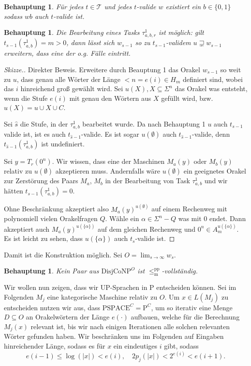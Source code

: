 \documentclass[nofonts]{uebung}
\newtheorem{claim}[theorem]{Behauptung}
\def\P{\ensuremath{\mathrm{P}}}
\def\DisjCoNP{\ensuremath{\mathrm{DisjCoNP}}}
\def\leqmpp{\ensuremath{\leq_\mathrm{m}^\mathrm{pp}}}
\begin{document}
\begin{claim}
    Für jedes $t\in\mathcal T$ und jedes $t$-valide $w$ existiert ein $b\in\{0,1\}$ sodass $wb$ auch $t$-valide ist.
\end{claim}

\begin{claim}
    Die Bearbeitung eines Tasks $\tau^1_{a,b,r}$ ist möglich: gilt $t_{s-1}(\tau^1_{a,b})=m>0$, dann lässt sich $w_{s-1}$ so zu $t_{s-1}$-validem $u\sqsupsetneq w_{s-1}$ erweitern, dass eine der o.g. Fälle eintritt.
\end{claim}
\begin{proof}[Skizze.]
    Direkter Beweis. %
    Erweitere durch Beauptung 1 das Orakel $w_{s-1}$ so weit zu $u$, dass genau alle Wörter der Länge $<n=e(i)\in H_m$ definiert sind, wobei das $i$ hinreichend groß gewählt wird. Sei $u(X), X\subseteq \Sigma^n$ das Orakel was entsteht, wenn die Stufe $e(i)$ mit genau den Wörtern aus $X$ gefüllt wird, bzw. $u(X)=u\cup X\cup C$.

    Sei $\hat{s}$ die Stufe, in der $\tau^1_{a,b}$ bearbeitet wurde.
    Da nach Behauptung 1 $u$ auch $t_{s-1}$ valide ist, ist es auch $t_{\hat{s}-1}$-valide.
    Es ist sogar $u(\emptyset)$ auch $t_{\hat{s}-1}$-valide, denn $t_{\hat{s}-1}(\tau^1_{a,b})$ ist undefiniert.

    Sei $y=T_r(0^n)$.
    Wir wissen, dass eine der Maschinen $M_a(y)$ oder $M_b(y)$ relativ zu $u(\emptyset)$ akzeptieren muss.
    Andernfalls wäre $u(\emptyset)$ ein geeignetes Orakel zur Zerstörung des Paars $M_a$, $M_b$ in der Bearbeitung von Task $\tau^1_{a,b}$ und wir hätten $t_{s-1}(\tau^1_{a,b})=0$.

    Ohne Beschränkung akzeptiert also $M_a(y)^{u(\emptyset)}$ auf einem Rechenweg mit polynomiell vielen Orakelfragen $Q$.
    Wähle ein $\alpha\in \Sigma^n-Q$ was mit $0$ endet. Dann akzeptiert auch $M_a(y)^{u(\{\alpha\})}$ auf dem gleichen Rechenweg und $0^n\in A_m^{u(\{\alpha\})}$. Es ist leicht zu sehen, dass $u(\{\alpha\})$ auch $t_{s}$-valide ist.
\end{proof}

Damit ist die Konstruktion möglich. Sei $O=\lim_{s\to\infty} w_s$.

\begin{claim}
    Kein Paar aus $\DisjCoNP^O$ ist $\leqmpp$-vollständig.
\end{claim}

Wir wollen nun zeigen, dass wir UP-Sprachen in P entscheiden können. Sei im Folgenden $M_j$ eine kategorische Maschine relativ zu $O$. Um $x\in L(M_j)$ zu entscheiden nutzen wir aus, dass $\mathrm{PSPACE}^C=\P^C$, um so iterativ eine Menge $D\subseteq O$ an Orakelwörtern der Länge $e(\cdot)$ aufbauen, welche für die Berechnung $M_j(x)$ relevant ist, bis wir nach einigen Iterationen alle solchen relevanten Wörter gefunden haben. 
Wir beschränken uns im Folgenden auf Eingaben hinreichender Länge, sodass es für $x$ ein eindeutiges $i$ gibt, sodass
\[ e(i-1) \leq \log(|x|) < e(i), \quad 2p_j(|x|)< 2^{e(i)} < e(i+1).\tag{\ast} \]
\end{document}

